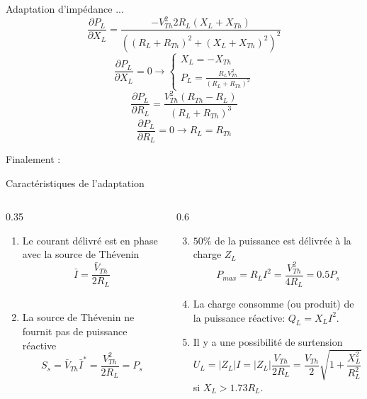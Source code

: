 	
	\begin{frame}{Adaptation d'impédance ...}
		\[\frac{\partial P_L}{\partial X_L}=\frac{-V_{Th}^2 2R_L(X_L+X_{Th})}
		{((R_L+R_{Th})^2+(X_L+X_{Th})^2)^2}\]
		\[\frac{\partial P_L}{\partial X_L}=0 \rightarrow 
		\begin{cases}
		X_L=-X_{Th}\\
		P_L=\frac{R_L
			V_{Th}^2}{(R_L+R_{Th})^2}
		\end{cases}\]
		\[\frac{\partial P_L}{\partial
			R_L}=\frac{V_{Th}^2(R_{Th}-R_L)}{(R_L+R_{Th})^3}\]
		\[\frac{\partial P_L}{\partial R_L}=0 \rightarrow 
		R_L=R_{Th}\]
		
		Finalement :
		\begin{center}
		\end{center}
	\end{frame}
	
	\begin{frame}{Caractéristiques de l'adaptation}
	
	\begin{columns}
  \begin{column}{0.35\textwidth}  
	\begin{enumerate}
		\item Le courant délivré est en phase avec la source de Thévenin $$\bar{I}=\frac{\bar{V}_{Th}}{2R_L}$$\\
		\item La source de Thévenin ne fournit pas de puissance réactive $$S_{s}=\bar{V}_{Th}\bar{I}^*=\frac{V_{Th}^2}{2R_L}= P_{s}$$
	\end{enumerate}				
\end{column}
\begin{column}{0.6\textwidth}
	\begin{enumerate}
		\setcounter{enumi}{2}
	\item $50\%$ de la puissance est délivrée à la charge $Z_L$
		\[P_{max}=R_LI^2=\frac{V_{Th}^2}{4R_L}=0.5P_{s}\]
	\item La charge consomme (ou produit) de la puissance réactive: $Q_L=X_LI^2$.
	\item Il y a une possibilité de surtension
	\[U_L=|Z_L|I=|Z_L|\frac{V_{Th}}{2R_L}=\frac{V_{Th}}{2}\sqrt{1+\frac{X_L^2}{R_L^2}}
	> V_{Th}\] si $X_L>1.73R_L$.
	\end{enumerate}	
  \end{column}
\end{columns}
	\end{frame}
	
